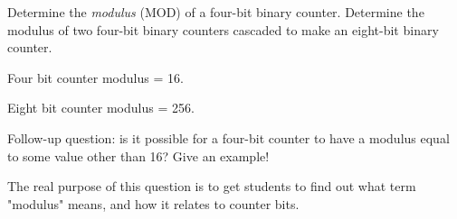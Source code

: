 

Determine the {\it modulus} (MOD) of a four-bit binary counter.  Determine the modulus of two four-bit binary counters cascaded to make an eight-bit binary counter.







Four bit counter modulus = 16.

\vskip 10pt

Eight bit counter modulus = 256.

\vskip 10pt

Follow-up question: is it possible for a four-bit counter to have a modulus equal to some value other than 16?  Give an example!







The real purpose of this question is to get students to find out what term "modulus" means, and how it relates to counter bits.





